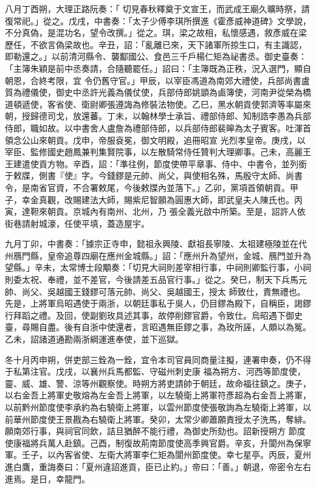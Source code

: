 \begin{pinyinscope}
 八月丁酉朔，大理正路阮奏：「
 切見春秋釋奠于文宣王，而武成王廟久曠時祭，請復常祀。」從之。戊戌，中書奏：「太子少傅李琪所撰進《霍彥威神道碑》文學說，不分真偽，是混功名，望令改撰。」從之。琪，梁之故相，私懷感遇，敘彥威在梁歷任，不欲言偽梁故也。辛丑，詔：「亂離已來，天下諸軍所掠生口，有主識認，即勒還之。」以前清河縣令、襲酅國公、食邑三千戶楊仁矩為祕書丞。御史臺奏：「主簿朱穎是前中丞奏請，合隨聽罷任。」詔曰：「主簿既為正秩，況入選門，顯自朝恩，合終考限，宜
 令仍舊守官。」甲辰，以宰臣馮道為南郊大禮使，兵部尚書盧質為禮儀使，御史中丞許光義為儀仗使，兵部侍郎姚顗為鹵簿使，河南尹從榮為橋道頓遞使，客省使、衛尉卿張遵誨為修裝法物使。乙巳，黑水朝貢使郭濟等率屬來朝，授歸德司戈，放還蕃。丁未，以翰林學士承旨、禮部侍郎、知制誥李愚為兵部侍郎，職如故。以中書舍人盧詹為禮部侍郎，以兵部侍郎裴皞為太子賓客。吐渾首領念公山來朝貢。戊申，帝服袞冕，御文明殿，追冊昭宣
 光烈孝皇帝。庚戌，以宰臣、監修國史趙鳳兼判集賢院事，以左散騎常侍任贊判大理卿事。己未，高麗王王建遣使貢方物。辛酉，詔：「準往例，節度使帶平章事、侍中、中書令，並列銜于敕牒，側書『使』字。今錢鏐是元帥、尚父，與使相名殊，馬殷守太師、尚書令，是南省官資，不合署敕尾，今後敕牒內並落下。」乙卯，黨項首領朝貢。甲子，幸金真觀，改賜建法大師，賜紫尼智願為圓惠大師，即武皇夫人陳氏也。丙寅，達靼來朝貢。京城內有南州、北州，乃
 張全義光啟中所築。至是，詔許人依街巷請射城濠，任使平填，蓋造屋宇。



 九月丁卯，中書奏：「據宗正寺申，懿祖永興陵、獻祖長寧陵、太祖建極陵並在代州鴈門縣，皇帝追尊四廟在應州金城縣。」詔：「應州升為望州，金城、鴈門並升為望縣。」辛未，太常博士段顒奏：「切見大祠則差宰相行事，中祠則卿監行事，小祠則委太祝、奉禮，並不差官，今後請差五品官行事。」從之。癸巳，制天下兵馬元帥、尚父、吳越國王錢鏐可落元帥、尚父、吳越國王，授太
 師致仕，責無禮也。先是，上將軍烏昭遇使于兩浙，以朝廷事私于吳人，仍目鏐為殿下，自稱臣，謁鏐行拜蹈之禮。及回，使副劉玫具述其事，故停削鏐官爵，令致仕。烏昭遇下御史臺，尋賜自盡。後有自浙中使還者，言昭遇無臣鏐之事，為玫所誣，人頗以為冤。乙未，詔諸道通勘兩浙綱運進奉使，並下巡獄。



 冬十月丙申朔，併吏部三銓為一銓，宜令本司官員同商量注擬，連署申奏，仍不得于私第注官。戊戌，以襄州兵馬都監、守磁州刺史康
 福為朔方、河西等節度使，靈、威、雄、警、涼等州觀察使。時朔方將吏請帥于朝廷，故命福往鎮之。庚子，以右金吾上將軍史敬熔為左金吾上將軍，以左驍衛上將軍符彥超為右金吾上將軍，以前黔州節度使李承約為右驍衛上將軍，以雲州節度使張敬詢為左驍衛上將軍，以前華州節度使王景戡為右驍衛上將軍。癸卯，太常少卿蕭願責授太子洗馬，奪緋。願南郊行事，與祠官同飲，詰旦猶醉不能行禮，為御史所劾也。詔新授朔方
 節度使康福將兵萬人赴鎮。己酉，制復故荊南節度使高季興官爵。辛亥，升閬州為保寧軍。壬子，以內客省使、左衛大將軍李仁矩為閬州節度使。幸七星亭。丙辰，夏州進白鷹，重誨奏曰：「夏州違詔進貢，臣已止約。」帝曰：「善。」朝退，帝密令左右進焉。是日，幸龍門。




\end{pinyinscope}

